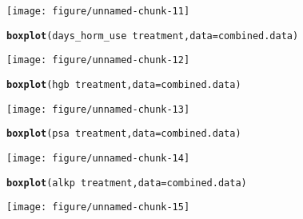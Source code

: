 \documentclass{article}\usepackage[]{graphicx}\usepackage[]{color}
\makeatletter
\def\maxwidth{ %
  \ifdim\Gin@nat@width>\linewidth
    \linewidth
  \else
    \Gin@nat@width
  \fi
}
\newcommand{\hlopt}[1]{\textcolor[rgb]{0,0,0}{#1}}%
\newcommand{\hlstd}[1]{\textcolor[rgb]{0.345,0.345,0.345}{#1}}%
\newcommand{\hlkwc}[1]{\textcolor[rgb]{0.333,0.667,0.333}{#1}}%
\newcommand{\hlkwd}[1]{\textcolor[rgb]{0.737,0.353,0.396}{\textbf{#1}}}%
\newenvironment{kframe}{%
 \def\at@end@of@kframe{}%
 \ifinner\ifhmode%
  \def\at@end@of@kframe{\end{minipage}}%
  \begin{minipage}{\columnwidth}%
 \fi\fi%
 \def\FrameCommand##1{\hskip\@totalleftmargin \hskip-\fboxsep
 \colorbox{shadecolor}{##1}\hskip-\fboxsep
     \hskip-\linewidth \hskip-\@totalleftmargin \hskip\columnwidth}%
 \MakeFramed {\advance\hsize-\width
   \@totalleftmargin\z@ \linewidth\hsize
   \@setminipage}}%
 {\par\unskip\endMakeFramed%
 \at@end@of@kframe}
\newenvironment{knitrout}{}{} %
\makeatother
\begin{document}
\begin{knitrout}
{\centering \texttt{[image: figure/unnamed-chunk-11]} 

}


\begin{kframe}\begin{alltt}
\hlkwd{boxplot}\hlstd{(days_horm_use} \hlopt{~} \hlstd{treatment,} \hlkwc{data} \hlstd{= combined.data)}
\end{alltt}
\end{kframe}

{\centering \texttt{[image: figure/unnamed-chunk-12]} 

}


\begin{kframe}\begin{alltt}
\hlkwd{boxplot}\hlstd{(hgb} \hlopt{~} \hlstd{treatment,} \hlkwc{data} \hlstd{= combined.data)}
\end{alltt}
\end{kframe}

{\centering \texttt{[image: figure/unnamed-chunk-13]} 

}


\begin{kframe}\begin{alltt}
\hlkwd{boxplot}\hlstd{(psa} \hlopt{~} \hlstd{treatment,} \hlkwc{data} \hlstd{= combined.data)}
\end{alltt}
\end{kframe}

{\centering \texttt{[image: figure/unnamed-chunk-14]} 

}


\begin{kframe}\begin{alltt}
\hlkwd{boxplot}\hlstd{(alkp} \hlopt{~} \hlstd{treatment,} \hlkwc{data} \hlstd{= combined.data)}
\end{alltt}
\end{kframe}

{\centering \texttt{[image: figure/unnamed-chunk-15]} 

}



\end{knitrout}
\end{document}

